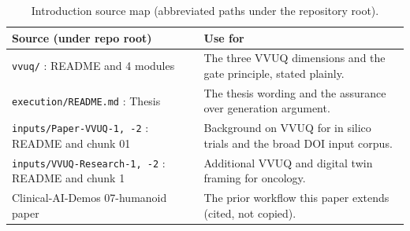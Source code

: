 \begin{table}[H]
\caption{Introduction source map (abbreviated paths under the repository root).}
\label{tab:intro_sources}
\centering
\begin{tabularx}{\textwidth}{L{4.8cm} >{\raggedright\arraybackslash}X}
\toprule
\textbf{Source (under repo root)} & \textbf{Use for} \\
\midrule
  \texttt{vvuq/} : README and 4 modules & The three VVUQ dimensions and the gate principle, stated plainly. \\
  \texttt{execution/README.md} : Thesis & The thesis wording and the assurance over generation argument. \\
  \texttt{inputs/Paper-VVUQ-1, -2} : README and chunk 01 & Background on VVUQ for in silico trials and the broad DOI input corpus. \\
  \texttt{inputs/VVUQ-Research-1, -2} : README and chunk 1 & Additional VVUQ and digital twin framing for oncology. \\
  Clinical-AI-Demos 07-humanoid paper & The prior workflow this paper extends (cited, not copied). \\
\bottomrule
\end{tabularx}
\end{table}
